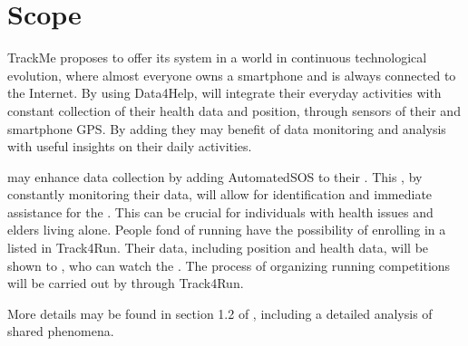 \documentclass[../../DD.tex]{subfiles}
\begin{document}
\section{Scope}
	TrackMe proposes to offer its system in a world in continuous technological evolution, where almost everyone owns a smartphone and is always connected to the Internet.
	By using Data4Help,  will integrate their everyday activities with constant collection of their health data and position, through sensors of their  and smartphone GPS. By adding  they may benefit of data monitoring and analysis with useful insights on their daily activities. 

	 may enhance data collection by adding AutomatedSOS to their . This , by constantly monitoring their data, will allow for identification and immediate assistance for the . This can be crucial for individuals with health issues and elders living alone.
	People fond of running have the possibility of enrolling in a  listed in Track4Run. Their data, including position and health data, will be shown to , who can watch the . The process of organizing running competitions will be carried out by  through Track4Run.

	More details may be found in section 1.2 of \hyperref[3], including a detailed analysis of shared phenomena.
\end{document}
